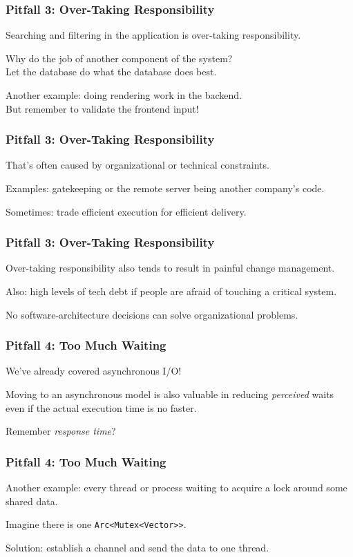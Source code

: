 \begin{frame}
\frametitle{Pitfall 3: Over-Taking Responsibility}
Searching and filtering in the application is over-taking responsibility.

Why do the job of another component of the system?\\
\quad Let the database do what the database does best.

Another example: doing rendering work in the backend.\\
\quad But remember to validate the frontend input!

\end{frame}

\begin{frame}
\frametitle{Pitfall 3: Over-Taking Responsibility}
That's often caused by organizational or technical constraints.

Examples: gatekeeping or the remote server being another company's code.

Sometimes: trade efficient execution for efficient delivery.

\end{frame}

\begin{frame}
\frametitle{Pitfall 3: Over-Taking Responsibility}

Over-taking responsibility also tends to result in painful change management.

Also: high levels of tech debt if people are afraid of touching a critical system.

No software-architecture decisions can solve organizational problems.

\end{frame}

\begin{frame}
\frametitle{Pitfall 4: Too Much Waiting}

We've already covered asynchronous I/O!

Moving to an asynchronous model is also valuable in reducing \textit{perceived} waits even if the actual execution time is no faster.

Remember \textit{response time}?

\end{frame}

\begin{frame}
\frametitle{Pitfall 4: Too Much Waiting}
Another example: every thread or process waiting to acquire a lock around some shared data. 

Imagine there is one \texttt{Arc<Mutex<Vector>{}>}.

Solution: establish a channel and send the data to one thread.


\end{frame}



